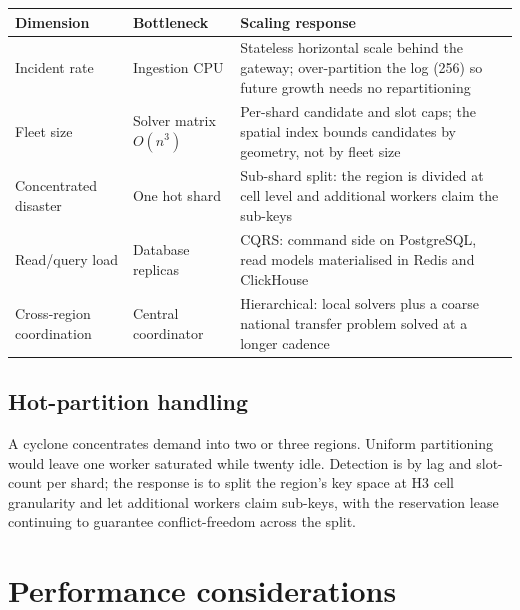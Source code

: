 \begin{center}\footnotesize
\begin{tabular}{@{}lp{46mm}p{52mm}@{}}
\toprule
\textbf{Dimension} & \textbf{Bottleneck} & \textbf{Scaling response} \\
\midrule
Incident rate & Ingestion CPU & Stateless horizontal scale behind the gateway; over-partition the log (256) so future growth needs no repartitioning \\
Fleet size & Solver matrix $O(n^3)$ & Per-shard candidate and slot caps; the spatial index bounds candidates by geometry, not by fleet size \\
Concentrated disaster & One hot shard & Sub-shard split: the region is divided at cell level and additional workers claim the sub-keys \\
Read/query load & Database replicas & CQRS: command side on PostgreSQL, read models materialised in Redis and ClickHouse \\
Cross-region coordination & Central coordinator & Hierarchical: local solvers plus a coarse national transfer problem solved at a longer cadence \\
\bottomrule
\end{tabular}
\end{center}

\begin{decbox}
\end{decbox}

\subsection{Hot-partition handling}

A cyclone concentrates demand into two or three regions. Uniform partitioning
would leave one worker saturated while twenty idle. Detection is by lag and
slot-count per shard; the response is to split the region's key space at H3
cell granularity and let additional workers claim sub-keys, with the
reservation lease continuing to guarantee conflict-freedom across the split.

\section{Performance considerations}

